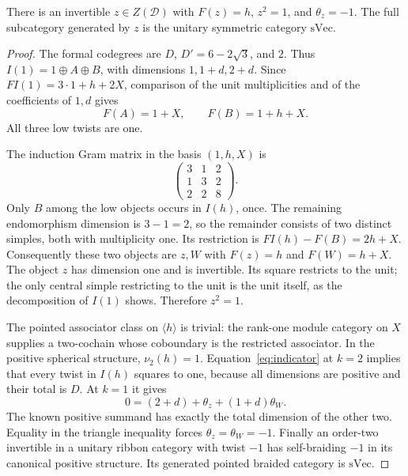 \begin{lemma}\label{lem:fermion}
There is an invertible $z\in Z(\mathcal D)$ with
$F(z)=h$, $z^2=1$, and $\theta_z=-1$. The full subcategory generated
by $z$ is the unitary symmetric category $\mathrm{sVec}$.
\end{lemma}
\begin{proof}
The formal codegrees are $D$, $D'=6-2\sqrt3$, and $2$.
Thus $I(1)=1\oplus A\oplus B$, with dimensions
$1,1+d,2+d$. Since $FI(1)=3\cdot1+h+2X$, comparison of the unit
multiplicities and of the coefficients of $1,d$ gives
\[
 F(A)=1+X,\qquad F(B)=1+h+X.
\]
All three low twists are one.

The induction Gram matrix in the basis $(1,h,X)$ is
\[
 \begin{pmatrix}3&1&2\\1&3&2\\2&2&8\end{pmatrix}.
\]
Only $B$ among the low objects occurs in $I(h)$, once. The remaining
endomorphism dimension is $3-1=2$, so the remainder consists of two
distinct simples, both with multiplicity one. Its restriction is
$FI(h)-F(B)=2h+X$. Consequently these two objects are $z,W$ with
$F(z)=h$ and $F(W)=h+X$. The object $z$ has dimension one and is
invertible. Its square restricts to the unit; the only central simple
restricting to the unit is the unit itself, as the decomposition of
$I(1)$ shows. Therefore $z^2=1$.

The pointed associator class on $\langle h\rangle$ is trivial: the
rank-one module category on $X$ supplies a two-cochain whose coboundary
is the restricted associator. In the positive spherical structure,
$\nu_2(h)=1$. Equation~\eqref{eq:indicator} at $k=2$ implies that every
twist in $I(h)$ squares to one, because all dimensions are positive and
their total is $D$. At $k=1$ it gives
\[
 0=(2+d)+\theta_z+(1+d)\theta_W.
\]
The known positive summand has exactly the total dimension of the other
two. Equality in the triangle inequality forces
$\theta_z=\theta_W=-1$. Finally an order-two invertible in a unitary
ribbon category with twist $-1$ has self-braiding $-1$ in its canonical
positive structure. Its generated pointed braided category is
$\mathrm{sVec}$.
\end{proof}

